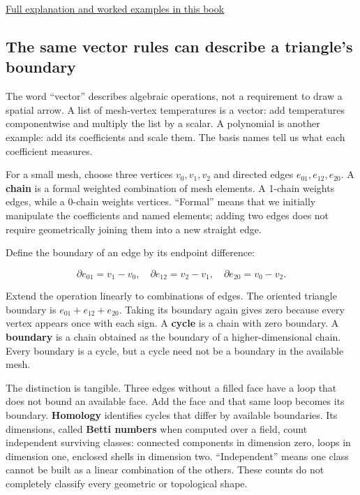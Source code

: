 \hyperref[01-foundations-i-ch017-a-ruler-needs-more-than-coordinate-components]{Full explanation and worked examples in this book}

\subsection{The same vector rules can describe a triangle's boundary}\label{01-foundations-i-ch017-the-same-vector-rules-can-describe-a-triangles-boundary}

The word ``vector'' describes algebraic operations, not a requirement to draw a spatial arrow. A list of mesh-vertex temperatures is a vector: add temperatures componentwise and multiply the list by a scalar. A polynomial is another example: add its coefficients and scale them. The basis names tell us what each coefficient measures.

For a small mesh, choose three vertices \(v_0,v_1,v_2\) and directed edges \(e_{01},e_{12},e_{20}\). A \textbf{chain} is a formal weighted combination of mesh elements. A 1-chain weights edges, while a 0-chain weights vertices. ``Formal'' means that we initially manipulate the coefficients and named elements; adding two edges does not require geometrically joining them into a new straight edge.

Define the boundary of an edge by its endpoint difference:

\[
\partial e_{01}=v_1-v_0,\quad
\partial e_{12}=v_2-v_1,\quad
\partial e_{20}=v_0-v_2.
\]

Extend the operation linearly to combinations of edges. The oriented triangle boundary is \(e_{01}+e_{12}+e_{20}\). Taking its boundary again gives zero because every vertex appears once with each sign. A \textbf{cycle} is a chain with zero boundary. A \textbf{boundary} is a chain obtained as the boundary of a higher-dimensional chain. Every boundary is a cycle, but a cycle need not be a boundary in the available mesh.

The distinction is tangible. Three edges without a filled face have a loop that does not bound an available face. Add the face and that same loop becomes its boundary. \textbf{Homology} identifies cycles that differ by available boundaries. Its dimensions, called \textbf{Betti numbers} when computed over a field, count independent surviving classes: connected components in dimension zero, loops in dimension one, enclosed shells in dimension two. ``Independent'' means one class cannot be built as a linear combination of the others. These counts do not completely classify every geometric or topological shape.

